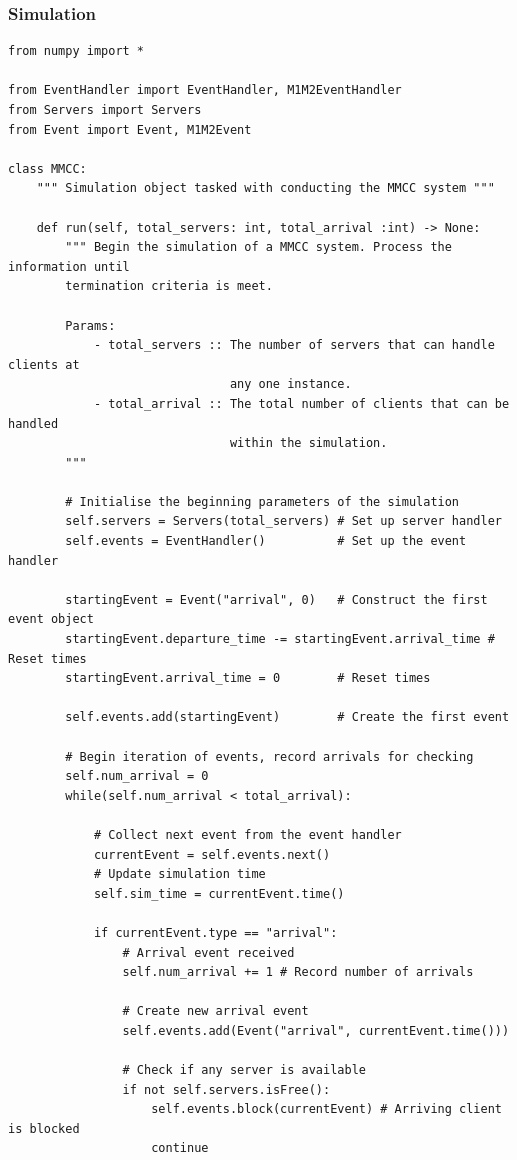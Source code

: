 \documentclass{ecmm427_assignment}
\begin{document}
\subsubsection{Simulation}
\begin{verbatim}
from numpy import *

from EventHandler import EventHandler, M1M2EventHandler
from Servers import Servers
from Event import Event, M1M2Event

class MMCC:
    """ Simulation object tasked with conducting the MMCC system """

    def run(self, total_servers: int, total_arrival :int) -> None:
        """ Begin the simulation of a MMCC system. Process the information until
        termination criteria is meet.

        Params:
            - total_servers :: The number of servers that can handle clients at 
                               any one instance.
            - total_arrival :: The total number of clients that can be handled
                               within the simulation.
        """

        # Initialise the beginning parameters of the simulation
        self.servers = Servers(total_servers) # Set up server handler
        self.events = EventHandler()          # Set up the event handler

        startingEvent = Event("arrival", 0)   # Construct the first event object
        startingEvent.departure_time -= startingEvent.arrival_time # Reset times
        startingEvent.arrival_time = 0        # Reset times

        self.events.add(startingEvent)        # Create the first event

        # Begin iteration of events, record arrivals for checking
        self.num_arrival = 0
        while(self.num_arrival < total_arrival):

            # Collect next event from the event handler
            currentEvent = self.events.next()
            # Update simulation time
            self.sim_time = currentEvent.time()

            if currentEvent.type == "arrival":
                # Arrival event received
                self.num_arrival += 1 # Record number of arrivals

                # Create new arrival event
                self.events.add(Event("arrival", currentEvent.time()))

                # Check if any server is available
                if not self.servers.isFree():
                    self.events.block(currentEvent) # Arriving client is blocked
                    continue
                

\end{verbatim}
\end{document}
